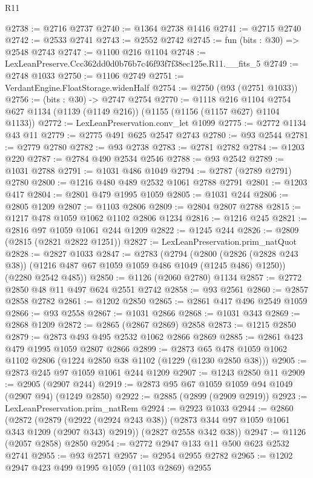 \begin{lexlean}{R11}
\begin{coremodule}
@2738 := @2716 @2737
@2740 := @1364 @2738 @1416
@2741 := @2715 @2740
@2742 := @2533 @2741
@2743 := @2552 @2742
@2745 := fun (bits : @30) => @2548 @2743
@2747 := @1100 @216 @1104
@2748 := LexLeanPreserve.Ccc362dd0d0b76b7c46f93f7f38ec125e.R11.__fits_5
@2749 := @2748 @1033
@2750 := @1106 @2749
@2751 := VerdantEngine.FloatStorage.widenHalf
@2754 := @2750 (@93 (@2751 @1033))
@2756 := (bits : @30) -> @2747 @2754
@2770 := @1118
    @216
    @1104
    @2754
    @627
    @1134
    (@1139 (@1149 @216))
    (@1155 (@1156 (@1157 @627) @1104 @1133))
@2772 := LexLeanPreservation.conv_let @1099
@2775 := @2772 @1134 @43 @11
@2779 := @2775 @491 @625 @2547 @2743
@2780 := @93 @2544
@2781 := @2779 @2780
@2782 := @93 @2738
@2783 := @2781 @2782
@2784 := @1203 @220
@2787 := @2784 @490 @2534 @2546
@2788 := @93 @2542
@2789 := @1031 @2788
@2791 := @1031 @486 @1049
@2794 := @2787 (@2789 @2791) @2780
@2800 := @1216 @480 @489 @2532 @1061 @2788 @2791
@2801 := @1203 @417
@2804 := @2801 @479 @1995 @1059
@2805 := @1031 @244
@2806 := @2805 @1209
@2807 := @1103 @2806
@2809 := @2804 @2807 @2788
@2815 := @1217 @478 @1059 @1062 @1102 @2806 @1234
@2816 := @1216 @245
@2821 := @2816 @97 @1059 @1061 @244 @1209
@2822 := @1245 @244
@2826 := @2809 (@2815 (@2821 @2822 @1251))
@2827 := LexLeanPreservation.prim_natQuot
@2828 := @2827 @1033
@2847 := @2783
    (@2794
      (@2800 (@2826 (@2828 @243 @38)) (@1216 @487 @67 @1059 @1059 @486 @1049 (@1245 @486) @1250))
      (@2280 @2542 @485))
@2850 := @1126 (@2060 @2780) @1134
@2857 := @2772 @2850 @48 @11 @497 @624 @2551 @2742
@2858 := @93 @2561
@2860 := @2857 @2858 @2782
@2861 := @1202 @2850
@2865 := @2861 @417 @496 @2549 @1059
@2866 := @93 @2558
@2867 := @1031 @2866
@2868 := @1031 @343
@2869 := @2868 @1209
@2872 := @2865 (@2867 @2869) @2858
@2873 := @1215 @2850
@2879 := @2873 @493 @495 @2532 @1062 @2866 @2869
@2885 := @2861 @423 @479 @1995 @1059 @2807 @2866
@2899 := @2873 @65 @478 @1059 @1062 @1102 @2806 (@1224 @2850 @38 @1102 (@1229 (@1230 @2850 @38)))
@2905 := @2873 @245 @97 @1059 @1061 @244 @1209
@2907 := @1243 @2850 @11
@2909 := @2905 (@2907 @244)
@2919 := @2873 @95 @67 @1059 @1059 @94 @1049 (@2907 @94) (@1249 @2850)
@2922 := @2885 (@2899 (@2909 @2919))
@2923 := LexLeanPreservation.prim_natRem
@2924 := @2923 @1033
@2944 := @2860
    (@2872
      (@2879 (@2922 (@2924 @243 @38)) (@2873 @344 @97 @1059 @1061 @343 @1209 (@2907 @343) @2919))
      (@2827 @2558 @342 @38))
@2947 := @1126 (@2057 @2858) @2850
@2954 := @2772 @2947 @133 @11 @500 @623 @2532 @2741
@2955 := @93 @2571
@2957 := @2954 @2955 @2782
@2965 := @1202 @2947 @423 @499 @1995 @1059 (@1103 @2869) @2955

\end{coremodule}
\end{lexlean}
